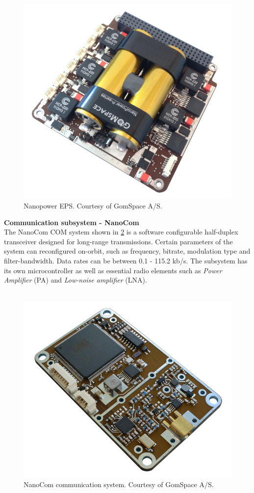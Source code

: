 \documentclass[english,12pt,a4paper,pdftex,elec,utf8]{aaltothesis}
\begin{document}
\\
\begin{figure}[h!]
\centering
\includegraphics[scale=0.2]{nanopower}
\caption{Nanopower EPS. Courtesy of GomSpace A/S. \cite{nanopowerds}}
\label{nanopower}
\end{figure}
\textbf{Communication subsystem - NanoCom}\\
The NanoCom COM system shown in \ref{nanocom} is a software configurable half-duplex transceiver designed for long-range transmissions. Certain parameters of the system can reconfigured on-orbit, such as frequency, bitrate, modulation type and filter-bandwidth. Data rates can be between 0.1 - 115.2 kb/s. The subsystem has its own microcontroller as well as essential radio elements such as \textit{Power Amplifier} (PA) and \textit{Low-noise amplifier} (LNA). \cite{nanocomds}\\
\\ 
\begin{figure}[h!]
\centering
\includegraphics[scale=0.2]{nanocomm_pcb}
\caption{NanoCom communication system. Courtesy of GomSpace A/S. \cite{nanocomds}}
\label{nanocom}
\end{figure} 
\end{document}
